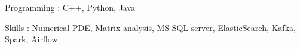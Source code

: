 


\begin{cvskills}


\cvskill
	{Programming : } 
	{C++, Python, Java} 

\iftrue  %
\cvskill
	{Skills : }
	{Numerical PDE, Matrix analysis, MS SQL server, ElasticSearch, Kafka, Spark, Airflow}
\fi



\iffalse
\cvskill
{Web : } %
{Ruby on Rails}
\fi

\end{cvskills}
